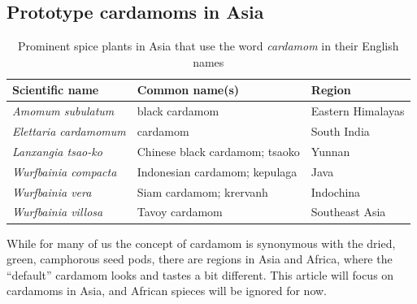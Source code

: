 \documentclass[12pt]{article}
\begin{document}
\subsection{Prototype cardamoms in Asia}

\begin{table}[ht]
    \centering
    \begin{tabularx}{\textwidth}{@{}XXl@{}}
    \toprule
    \textbf{Scientific name} & \textbf{Common name(s)} & \textbf{Region} \\ \midrule
    \textit{Amomum subulatum} & black cardamom & Eastern Himalayas \\
    \textit{Elettaria cardamomum} & cardamom & South India \\
    \textit{Lanxangia tsao-ko} & Chinese black cardamom; tsaoko & Yunnan \\
    \textit{Wurfbainia compacta} & Indonesian cardamom; kepulaga & Java \\
    \textit{Wurfbainia vera} & Siam cardamom; krervanh & Indochina \\
    \textit{Wurfbainia villosa} & Tavoy cardamom & Southeast Asia \\ \bottomrule
    \end{tabularx}
    \caption{Prominent spice plants in Asia that use the word \textit{cardamom} in their English names}
    \label{tab:cardamoms}
\end{table}

While for many of us the concept of cardamom is synonymous with the dried, green, camphorous seed pods, there are regions in Asia and Africa, where the ``default'' cardamom looks and tastes a bit different. This article will focus on cardamoms in Asia, and African spieces will be ignored for now. 
\end{document}
